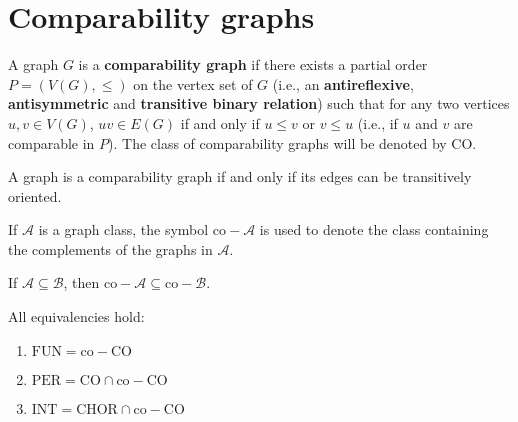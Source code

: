 \section{Comparability graphs}

\begin{defn}
	A graph $G$ is a \textbf{comparability graph} if there exists a partial order $P = (V(G), \leq)$ on the vertex set of $G$ (i.e., an \textbf{antireflexive}, \textbf{antisymmetric} and \textbf{transitive binary relation}) such that for any two vertices $u, v \in V(G)$, $uv \in E(G)$ if and only if $u \leq v$ or $v \leq u$ (i.e., if $u$ and $v$ are comparable in $P$). The class of comparability graphs will be denoted by CO.
\end{defn}

\begin{observ}
	A graph is a comparability graph if and only if its edges can be transitively oriented.
\end{observ}

\begin{notation}
	If $\mathcal{A}$ is a graph class, the symbol $\text{co}-\mathcal{A}$ is used to denote the class containing the complements of the graphs in $\mathcal{A}$.
\end{notation}

\begin{observ}
	If $\mathcal{A} \subseteq \mathcal{B}$, then $\text{co}-\mathcal{A} \subseteq \text{co}-\mathcal{B}$.
\end{observ}

\begin{thm}
	All equivalencies hold:
	
	\begin{enumerate}
		\item $\text{FUN} = \text{co}-\text{CO}$
		\item $\text{PER} = \text{CO} \cap \text{co}-\text{CO}$
		\item $\text{INT} = \text{CHOR} \cap \text{co}-\text{CO}$
	\end{enumerate}
\end{thm}

